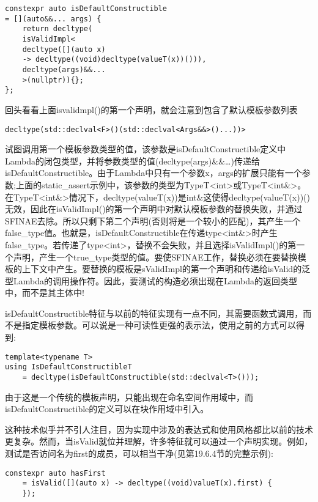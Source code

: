\begin{lstlisting}[style=styleCXX]
constexpr auto isDefaultConstructible
= [](auto&&... args) {
	return decltype(
	isValidImpl<
	decltype([](auto x)
	-> decltype((void)decltype(valueT(x))())),
	decltype(args)&&...
	>(nullptr)){};
};
\end{lstlisting}

回头看看上面isvalidmpl()的第一个声明，就会注意到包含了默认模板参数列表

\begin{lstlisting}[style=styleCXX]
decltype(std::declval<F>()(std::declval<Args&&>()...))>
\end{lstlisting}

试图调用第一个模板参数类型的值，该参数是isDefaultConstructible定义中Lambda的闭包类型，并将参数类型的值(decltype(args)\&\&…)传递给isDefaultConstructible。由于Lambda中只有一个参数x，args的扩展只能有一个参数;上面的static\_assert示例中，该参数的类型为TypeT<int>或TypeT<int\&>。在TypeT<int\&>情况下，decltype(valueT(x))是int\&这使得decltype(valueT(x))()无效，因此在isValidImpl()的第一个声明中对默认模板参数的替换失败，并通过SFINAE去除。所以只剩下第二个声明(否则将是一个较小的匹配)，其产生一个false\_type值。也就是，isDefaultConstructible在传递type<int\&>时产生false\_type。若传递了type<int>，替换不会失败，并且选择isValidImpl()的第一个声明，产生一个true\_type类型的值。要使SFINAE工作，替换必须在要替换模板的上下文中产生。要替换的模板是sValidImpl的第一个声明和传递给isValid的泛型Lambda的调用操作符。因此，要测试的构造必须出现在Lambda的返回类型中，而不是其主体中!

isDefaultConstructible特征与以前的特征实现有一点不同，其需要函数式调用，而不是指定模板参数。可以说是一种可读性更强的表示法，使用之前的方式可以得到:

\begin{lstlisting}[style=styleCXX]
template<typename T>
using IsDefaultConstructibleT
	= decltype(isDefaultConstructible(std::declval<T>()));
\end{lstlisting}

由于这是一个传统的模板声明，只能出现在命名空间作用域中，而isDefaultConstructible的定义可以在块作用域中引入。

这种技术似乎并不引人注目，因为实现中涉及的表达式和使用风格都比以前的技术更复杂。然而，当isValid就位并理解，许多特征就可以通过一个声明实现。例如，测试是否访问名为first的成员，可以相当干净(见第19.6.4节的完整示例):

\begin{lstlisting}[style=styleCXX]
constexpr auto hasFirst
	= isValid([](auto x) -> decltype((void)valueT(x).first) {
	});
\end{lstlisting}

